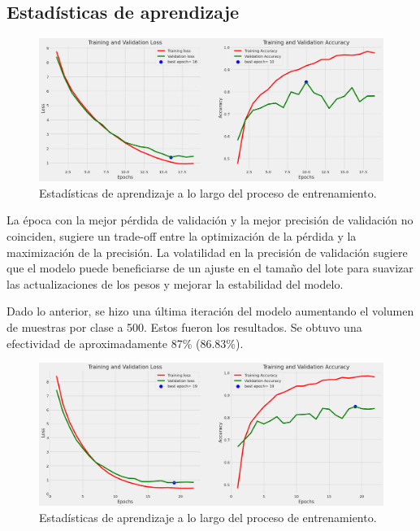 \subsection*{Estadísticas de aprendizaje}\label{sub:learning_statistics_p2}
		\begin{figure}[ht]%
      \begin{center}
      \includegraphics[width=1\textwidth]{./Graphics/training&validation_p2.png}
      \caption{Estadísticas de aprendizaje a lo largo del proceso de entrenamiento.\label{fig:training_validation_loss_p2}}
      \end{center}
		\end{figure}
  
La época con la mejor pérdida de validación y la mejor precisión de validación no coinciden, sugiere un trade-off entre la optimización de la pérdida y la maximización de la precisión. La volatilidad en la precisión de validación sugiere que el modelo puede beneficiarse de un ajuste en el tamaño del lote para suavizar las actualizaciones de los pesos y mejorar la estabilidad del modelo.

Dado lo anterior, se hizo una última iteración del modelo aumentando el volumen de muestras por clase a 500. Estos fueron los resultados. Se obtuvo una efectividad de aproximadamente 87\% (86.83\%).

\begin{figure}[ht]%
   \begin{center}
   \includegraphics[width=1\textwidth]{./Graphics/training&validation_p3.png}
   \caption{Estadísticas de aprendizaje a lo largo del proceso de entrenamiento.\label{fig:training_validation_loss_p3}}
   \end{center}
   \end{figure}

